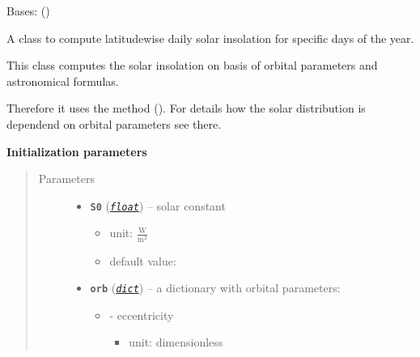 \documentclass[a4paper,10pt,english]{sphinxmanual}
\begin{document}
\begin{fulllineitems}
\label{api/climlab.radiation:climlab.radiation.insolation.DailyInsolation}
Bases: {\hyperref[api/climlab.radiation:climlab.radiation.insolation.AnnualMeanInsolation]{\emph{}}} ()

A class to compute latitudewise daily solar insolation for specific 
days of the year.

This class computes the solar insolation on basis of orbital parameters and 
astronomical formulas.

Therefore it uses the method {\hyperref[api/climlab.solar:climlab.solar.insolation.daily_insolation]{\emph{}}} ().
For details how the solar distribution is dependend on orbital parameters 
see there.

\textbf{Initialization parameters}
\begin{quote}\begin{description}
\item[{Parameters}] \leavevmode\begin{itemize}
\item {} 
\textbf{\texttt{S0}} (\href{http://docs.python.org/2.7/library/functions.html\#float}{\emph{\texttt{float}}}) -- 
solar constant
\begin{itemize}
\item {} 
unit: \(\frac{\textrm{W}}{\textrm{m}^2}\)

\item {} 
default value: 

\end{itemize}


\item {} 
\textbf{\texttt{orb}} (\href{http://docs.python.org/2.7/library/stdtypes.html\#dict}{\emph{\texttt{dict}}}) -- 
a dictionary with orbital parameters:
\begin{itemize}
\item {} 
 - eccentricity
\begin{itemize}
\item {} 
unit: dimensionless


\end{itemize}
\end{itemize}
\end{itemize}
\end{description}
\end{quote}
\end{fulllineitems}
\end{document}
